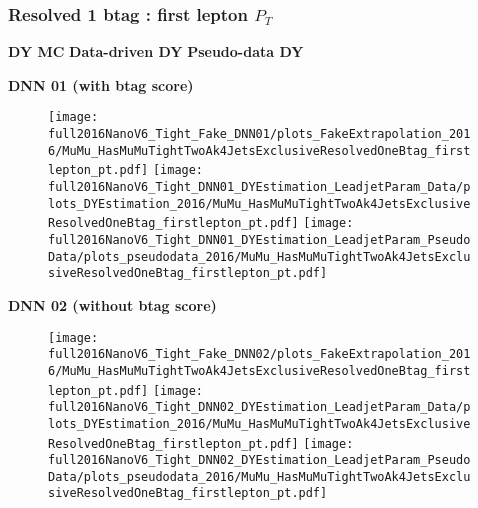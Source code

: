 \documentclass[9pt]{beamer}
\begin{document}
\begin{frame}
	\frametitle{Resolved 1 btag : first lepton $P_T$}
    \hspace{2cm} \textbf{DY MC} \hspace{1.9cm} \textbf{Data-driven DY} \hspace{1cm} \textbf{Pseudo-data DY}
    \begin{center}
        \textbf{DNN 01 (with btag score)}
    \end{center}
	\begin{figure}
		\texttt{[image: full2016NanoV6\_Tight\_Fake\_DNN01/plots\_FakeExtrapolation\_2016/MuMu\_HasMuMuTightTwoAk4JetsExclusiveResolvedOneBtag\_firstlepton\_pt.pdf]}
		\texttt{[image: full2016NanoV6\_Tight\_DNN01\_DYEstimation\_LeadjetParam\_Data/plots\_DYEstimation\_2016/MuMu\_HasMuMuTightTwoAk4JetsExclusiveResolvedOneBtag\_firstlepton\_pt.pdf]}
		\texttt{[image: full2016NanoV6\_Tight\_DNN01\_DYEstimation\_LeadjetParam\_PseudoData/plots\_pseudodata\_2016/MuMu\_HasMuMuTightTwoAk4JetsExclusiveResolvedOneBtag\_firstlepton\_pt.pdf]}
	\end{figure}
    \begin{center}
        \textbf{DNN 02 (without btag score)}
    \end{center}
	\begin{figure}
		\texttt{[image: full2016NanoV6\_Tight\_Fake\_DNN02/plots\_FakeExtrapolation\_2016/MuMu\_HasMuMuTightTwoAk4JetsExclusiveResolvedOneBtag\_firstlepton\_pt.pdf]}
		\texttt{[image: full2016NanoV6\_Tight\_DNN02\_DYEstimation\_LeadjetParam\_Data/plots\_DYEstimation\_2016/MuMu\_HasMuMuTightTwoAk4JetsExclusiveResolvedOneBtag\_firstlepton\_pt.pdf]}
		\texttt{[image: full2016NanoV6\_Tight\_DNN02\_DYEstimation\_LeadjetParam\_PseudoData/plots\_pseudodata\_2016/MuMu\_HasMuMuTightTwoAk4JetsExclusiveResolvedOneBtag\_firstlepton\_pt.pdf]}
	\end{figure}
\end{frame}
\end{document}
